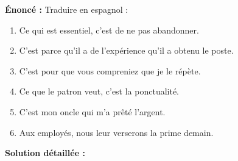 \documentclass[11pt]{article}
\begin{document}
\begin{exoresolu}
\textbf{Énoncé :} Traduire en espagnol :
\begin{enumerate}
    \item Ce qui est essentiel, c'est de ne pas abandonner.
    \item C'est parce qu'il a de l'expérience qu'il a obtenu le poste.
    \item C'est pour que vous compreniez que je le répète.
    \item Ce que le patron veut, c'est la ponctualité.
    \item C'est mon oncle qui m'a prêté l'argent.
    \item Aux employés, nous leur verserons la prime demain.
\end{enumerate}

\tcblower
\textbf{Solution détaillée :}


\end{exoresolu}
\end{document}
